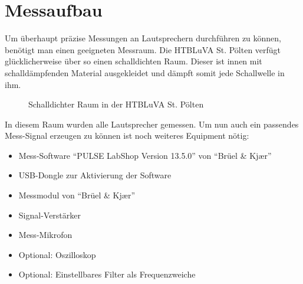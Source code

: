 \section{Messaufbau}\label{sec:5.2}
Um überhaupt präzise Messungen an Lautsprechern durchführen zu können, benötigt man einen geeigneten Messraum. Die HTBLuVA St. Pölten verfügt glücklicherweise über so einen schalldichten Raum. Dieser ist innen mit schalldämpfenden Material ausgekleidet und dämpft somit jede Schallwelle in ihm. 
\begin{figure} [H]
	\centering
	\caption{Schalldichter Raum in der HTBLuVA St. Pölten}
	\label{fig:5.2.1}
\end{figure}
In diesem Raum wurden alle Lautsprecher gemessen. Um nun auch ein passendes Mess-Signal erzeugen zu können ist noch weiteres Equipment nötig:
\begin{itemize}
	\item Mess-Software \enquote{PULSE LabShop Version 13.5.0} von \enquote{Brüel \& Kj\ae r}
	\item USB-Dongle zur Aktivierung der Software
	\item Messmodul von \enquote{Brüel \& Kj\ae r}
	\item Signal-Verstärker
	\item Mess-Mikrofon
	\item Optional: Oszilloskop
	\item Optional: Einstellbares Filter als Frequenzweiche
\end{itemize}

\newpage

